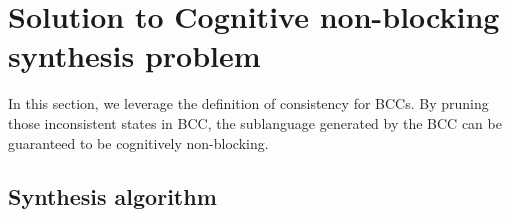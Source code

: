 \documentclass[journal,twoside,web]{ieeecolor}
\begin{document}
\section{Solution to Cognitive non-blocking synthesis problem}\label{sec:solu}
% 
% 
%

In this section, we leverage the definition of consistency for BCCs.
By pruning those inconsistent states in BCC, the sublanguage generated by the BCC can be guaranteed to be cognitively non-blocking.
%

\subsection{Synthesis algorithm}\label{subsec:supervisor_induction}
\end{document}
